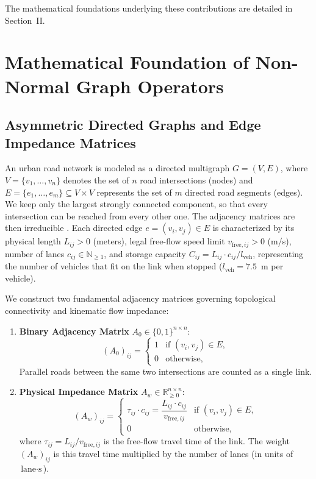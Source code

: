 \documentclass[journal]{IEEEtran}
\begin{document}
The mathematical foundations underlying these contributions are detailed in Section~II.

\section{Mathematical Foundation of Non-Normal Graph Operators}




\subsection{Asymmetric Directed Graphs and Edge Impedance Matrices}
An urban road network is modeled as a directed multigraph $G = (V, E)$, where $V = \{v_1, \dots, v_n\}$ denotes the set of $n$ road intersections (nodes) and $E = \{e_1, \dots, e_m\} \subseteq V \times V$ represents the set of $m$ directed road segments (edges). We keep only the largest strongly connected component, so that every intersection can be reached from every other one. The adjacency matrices are then irreducible \cite{Horn2013, Berman1994}. Each directed edge $e = (v_i, v_j) \in E$ is characterized by its physical length $L_{ij} > 0$ (meters), legal free-flow speed limit $v_{\text{free}, ij} > 0$ (m/s), number of lanes $c_{ij} \in \mathbb{N}_{\ge 1}$, and storage capacity $C_{ij} = L_{ij} \cdot c_{ij} / l_{\text{veh}}$, representing the number of vehicles that fit on the link when stopped ($l_{\text{veh}} = 7.5$~m per vehicle).

We construct two fundamental adjacency matrices governing topological connectivity and kinematic flow impedance:
\begin{enumerate}
    \item \textbf{Binary Adjacency Matrix} $A_0 \in \{0, 1\}^{n \times n}$:
    \begin{equation}
    (A_0)_{ij} = \begin{cases} 1 & \text{if } (v_i, v_j) \in E, \\ 0 & \text{otherwise,} \end{cases}
    \label{eq:binary_A}
    \end{equation}
    Parallel roads between the same two intersections are counted as a single link.
    \item \textbf{Physical Impedance Matrix} $A_w \in \mathbb{R}_{\ge 0}^{n \times n}$:
    \begin{equation}
    (A_w)_{ij} = \begin{cases} \tau_{ij} \cdot c_{ij} = \dfrac{L_{ij} \cdot c_{ij}}{v_{\text{free}, ij}} & \text{if } (v_i, v_j) \in E, \\ 0 & \text{otherwise,} \end{cases}
    \label{eq:adjacency}
    \end{equation}
    where $\tau_{ij} = L_{ij} / v_{\text{free}, ij}$ is the free-flow travel time of the link. The weight $(A_w)_{ij}$ is this travel time multiplied by the number of lanes (in units of $\text{lane}\cdot\text{s}$).
\end{enumerate}
\end{document}
